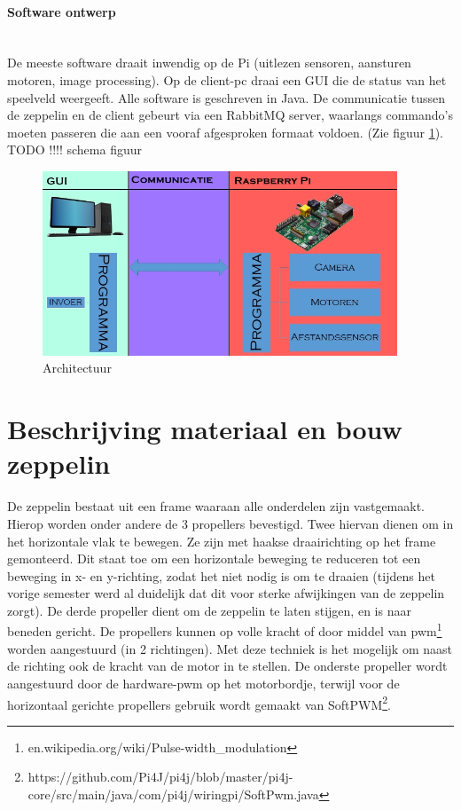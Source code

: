 \documentclass[tt]{penoverslag}
\begin{document}
\paragraph{Software ontwerp}
~\\
De meeste software draait inwendig op de Pi (uitlezen sensoren, aansturen motoren, image processing). Op de client-pc draai een GUI die de status van het speelveld weergeeft. Alle software is geschreven in Java. De communicatie tussen de zeppelin en de client gebeurt via een RabbitMQ server, waarlangs commando's moeten passeren die aan een vooraf afgesproken formaat voldoen. (Zie figuur \ref{schema}). \\

TODO !!!! schema figuur
\begin{figure}[ht!]
\centering
\includegraphics[height=55mm]{Schema.jpg}
\caption{Architectuur}
\label{schema}
\end{figure}

\section{Beschrijving materiaal en bouw zeppelin}
De zeppelin bestaat uit een frame waaraan alle onderdelen zijn vastgemaakt. Hierop worden onder andere de 3 propellers bevestigd. Twee hiervan dienen om in het horizontale vlak te bewegen. Ze zijn met haakse draairichting op het frame gemonteerd. Dit staat toe om een horizontale beweging te reduceren tot een beweging in x- en y-richting, zodat het niet nodig is om te draaien (tijdens het vorige semester werd al duidelijk dat dit voor sterke afwijkingen van de zeppelin zorgt). De derde propeller dient om de zeppelin te laten stijgen, en is naar beneden gericht. De propellers kunnen op volle kracht of door middel van pwm\footnote{en.wikipedia.org/wiki/Pulse-width\_modulation} worden aangestuurd (in 2 richtingen). Met deze techniek is het mogelijk om naast de richting ook de kracht van de motor in te stellen. De onderste propeller wordt aangestuurd door de hardware-pwm op het motorbordje, terwijl voor de horizontaal gerichte propellers gebruik wordt gemaakt van SoftPWM\footnote{https://github.com/Pi4J/pi4j/blob/master/pi4j-core/src/main/java/com/pi4j/wiringpi/SoftPwm.java}. ~\\
\end{document}
